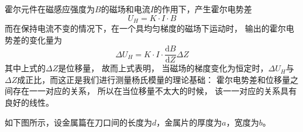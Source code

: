 \documentclass[UTF8]{article}
\theoremstyle{MyLineTheoremStyle} %
\theoremstyle{MyBlockTheoremStyle} %
\theoremstyle{MySubsubsectionStyle} %
\begin{document}
霍尔元件在磁感应强度为$B$的磁场和电流$I$的作用下，产生霍尔电势差\begin{displaymath}U_H=K\cdot I\cdot B\end{displaymath}而在保持电流不变的情况下，在一个具均匀梯度的磁场下运动时，
输出的霍尔电势差的变化量为\begin{displaymath}\Delta U_H=K\cdot I\cdot \frac{\mathrm{d}B}{\mathrm{d}Z}\Delta Z\end{displaymath}其中上式的$\Delta Z$是位移量，
故而上式表明，
当磁场的梯度变化为恒定时，$\Delta U_H$与$\Delta Z$成正比，而这正是我们进行测量杨氏模量的理论基础：
霍尔电势差和位移量之间存在一一对应的关系，
所以在当位移量不太大的时候，
该一一对应的关系具有良好的线性。


如下图所示，设金属篇在刀口间的长度为$ d $，金属片的厚度为$ a $，宽度为$ b $。
\end{document}
